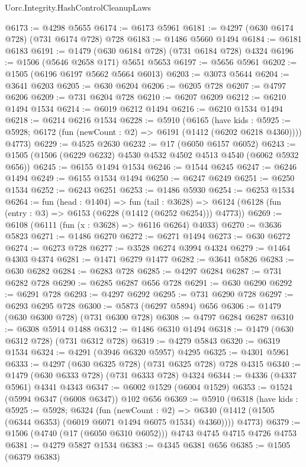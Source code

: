 \begin{lexlean}{Uorc.Integrity.HashControlCleanupLaws}
\begin{coremodule}
@6173 := @4298 @5655
@6174 := @6173 @5961
@6181 := @4297 (@630 @6174 @728) (@731 @6174 @728) @728
@6183 := @1486 @5660 @1494
@6184 := @6181 @6183
@6191 := @1479 (@630 @6184 @728) (@731 @6184 @728) @4324
@6196 := @1506 (@5646 @2658 @171) @5651 @5653
@6197 := @5656 @5961
@6202 := @1505 (@6196 @6197 @5662 @5664 @6013)
@6203 := @3073 @5644
@6204 := @3641 @6203
@6205 := @630 @6204
@6206 := @6205 @728
@6207 := @4797 @6206
@6209 := @731 @6204 @728
@6210 := @6207 @6209
@6212 := @6210 @1494 @1534
@6214 := @6019 @6212 @1494
@6216 := @6210 @1534 @1494
@6218 := @6214 @6216 @1534
@6228 := @5910
    (@6165
      (have kids : @5925 := @5928; @6172 (fun (newCount : @2) => @6191 (@1412 (@6202 @6218 @4360))))
      @4773)
@6229 := @4525 @2630
@6232 := @17 (@6050 @6157 @6052)
@6243 := @1505 (@1506 (@6229 @6232) @4530 @4532 @4502 @4513 @4540 (@6062 @5932 @656))
@6245 := @6155 @1494 @1534
@6246 := @1544 @6245
@6247 := @6246 @1494
@6249 := @6155 @1534 @1494
@6250 := @6247 @6249
@6251 := @6250 @1534
@6252 := @6243 @6251
@6253 := @1486 @5930
@6254 := @6253 @1534
@6264 := fun (head : @1404) =>
  fun (tail : @3628) =>
  @6124 (@6128 (fun (entry : @3) => @6153 (@6228 (@1412 (@6252 @6254))) @4773))
@6269 := @6108 (@6111 (fun (x : @3628) => @6116 @6264) @4033)
@6270 := @3636 @5823
@6271 := @1486 @6270
@6272 := @6271 @1494
@6273 := @630 @6272
@6274 := @6273 @728
@6277 := @3528 @6274 @3994 @4324
@6279 := @1464 @4303 @4374
@6281 := @1471 @6279 @1477
@6282 := @3641 @5826
@6283 := @630 @6282
@6284 := @6283 @728
@6285 := @4297 @6284
@6287 := @731 @6282 @728
@6290 := @6285 @6287 @656 @728
@6291 := @630 @6290
@6292 := @6291 @728
@6293 := @4297 @6292
@6295 := @731 @6290 @728
@6297 := @6293 @6295 @728
@6300 := @5873 (@6297 @5894) @656
@6306 := @1479 (@630 @6300 @728) (@731 @6300 @728)
@6308 := @4797 @6284 @6287
@6310 := @6308 @5914 @1488
@6312 := @1486 @6310 @1494
@6318 := @1479 (@630 @6312 @728) (@731 @6312 @728)
@6319 := @4279 @5843
@6320 := @6319 @1534
@6324 := @4291 (@3946 @6320 @5957) @4295
@6325 := @4301 @5961
@6333 := @4297 (@630 @6325 @728) (@731 @6325 @728) @728 @4315
@6340 := @1479 (@630 @6333 @728) (@731 @6333 @728) @4324
@6344 := @4336 (@4337 @5961) @4341 @4343
@6347 := @6002 @1529 (@6004 @1529)
@6353 := @1524 (@5994 @6347 (@6008 @6347)) @102 @656
@6369 := @5910
    (@6318
      (have kids : @5925 := @5928;
      @6324
        (fun (newCount : @2) =>
        @6340 (@1412 (@1505 (@6344 @6353) (@6019 @6071 @1494 @6075 @1534) @4360))))
      @4773)
@6379 := @1506 (@4740 (@17 (@6050 @6310 @6052))) @4743 @4745 @4715 @4726 @4753
@6381 := @4279 @5827 @1534
@6383 := @4345 @6381 @656
@6385 := @1505 (@6379 @6383)

\end{coremodule}
\end{lexlean}

